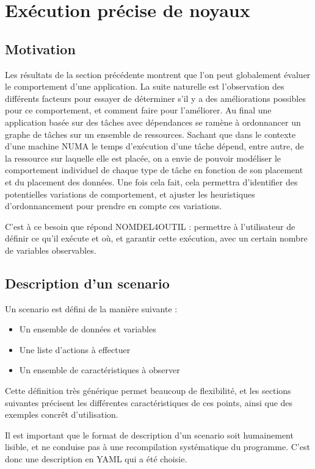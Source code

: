 \section{Exécution précise de noyaux}\label{sec:contribs:outil}

\subsection{Motivation}

Les résultats de la section précédente montrent que l'on peut globalement évaluer le comportement d'une application.
La suite naturelle est l'observation des différents facteurs pour essayer de déterminer s'il y a des améliorations possibles pour ce comportement, et comment faire pour l'améliorer.
Au final une application basée sur des tâches avec dépendances se ramène à ordonnancer un graphe de tâches sur un ensemble de ressources.
Sachant que dans le contexte d'une machine NUMA le temps d'exécution d'une tâche dépend, entre autre, de la ressource sur laquelle elle est placée, on a envie de pouvoir modéliser le comportement individuel de chaque type de tâche en fonction de son placement et du placement des données.
Une fois cela fait, cela permettra d'identifier des potentielles variations de comportement, et ajuster les heuristiques d'ordonnancement pour prendre en compte ces variations.

C'est à ce besoin que répond NOMDEL4OUTIL : permettre à l'utilisateur de définir ce qu'il exécute et où, et garantir cette exécution, avec un certain nombre de variables observables.

\subsection{Description d'un scenario}

Un scenario est défini de la manière suivante :
\begin{itemize}
 \item Un ensemble de données et variables
 \item Une liste d'actions à effectuer
 \item Un ensemble de caractéristiques à observer
\end{itemize}

Cette définition très générique permet beaucoup de flexibilité, et les sections suivantes précisent les différentes caractéristiques de ces points, ainsi que des exemples concrêt d'utilisation.

Il est important que le format de description d'un scenario soit humainement lisible, et ne conduise pas à une recompilation systématique du programme. C'est donc une description en YAML qui a été choisie.

